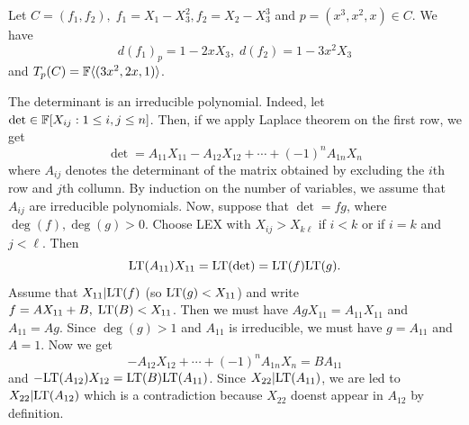 \begin{itemize}
  \begin{example}
    Let $C=(f_1,f_2),\;f_1=X_1-X_3^2, f_2=X_2-X_3^3$ and $p=(x^3,x^2,x)\in C$. We have 
    \begin{equation}
        d(f_1)_p = 1 - 2x X_3,\;d(f_2) = 1 - 3x^2 X_3 
    \end{equation}
    and $T_p(C)=\mathbb{F}\langle(3x^2,2x,1)\rangle$.
  \end{example} 

  \begin{example}
    The determinant is an irreducible polynomial. Indeed, let $\det\in\mathbb{F}[X_{ij}:1\leq i,j\leq n]$. Then, if we apply Laplace theorem
    on the first row, we get 
    \begin{equation}
        \det = A_{11} X_{11} - A_{12}X_{12} +\cdots+(-1)^nA_{1n}X_n
    \end{equation}
    where $A_{ij}$ denotes the determinant of the matrix obtained by excluding the $i$th row and $j$th collumn. By induction on 
    the number of variables, we assume that $A_{ij}$ are irreducible polynomials. Now, suppose that 
    $\det = fg$, where $\deg(f),\deg(g)>0$. Choose LEX with $X_{ij}>X_{k\ell}$ if $i<k$ or if $i=k$ and $j<\ell$. Then 
    \begin{equation}
     \text{LT}(A_{11})X_{11} =  \text{LT}(\det) = \text{LT}(f)\text{LT}(g).
    \end{equation}
    Assume that $X_{11}|\text{LT}(f)$ (so $\text{LT}(g)<X_{11}$) and write $f=AX_{11}+B,\;\text{LT}(B)<X_{11}$. 
    Then we must have $AgX_{11}=A_{11}X_{11}$ and $A_{11}=Ag$. Since $\deg(g)>1$ and $A_{11}$ is irreducible, we must have 
    $g=A_{11}$ and $A=1$. Now we get 
    \begin{equation}
        - A_{12}X_{12} +\cdots+(-1)^nA_{1n}X_n = BA_{11}
    \end{equation}
    and $-\text{LT}(A_{12})X_{12} = \text{LT}(B)\text{LT}(A_{11})$. Since $X_{22}|\text{LT}(A_{11})$, we are led to $X_{22}|\text{LT}(A_{12})$ which is 
    a contradiction because $X_{22}$ doenst appear in $A_{12}$ by definition.\par 


\end{example}
\end{itemize}
